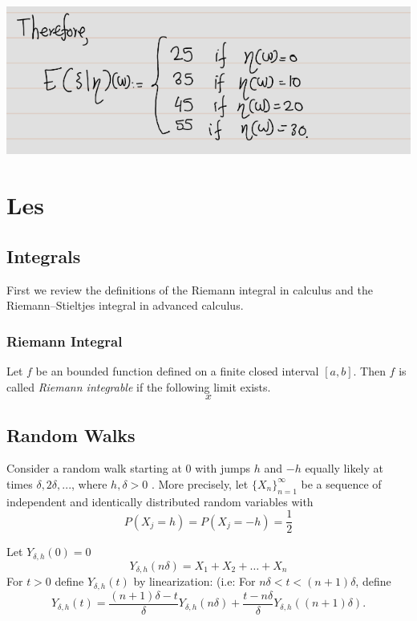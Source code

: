 \documentclass[
]{book}
\theoremstyle{definition}
\theoremstyle{definition}
\theoremstyle{definition}
\theoremstyle{definition}
\theoremstyle{remark}
\begin{document}
\includegraphics[width=18cm,height=\textheight]{fig/fig eg2.2-3.png}

\chapter{Les}\label{les}

\section{Integrals}\label{integrals}

First we review the definitions of the Riemann integral in calculus and the Riemann--Stieltjes integral in advanced calculus.

\subsection{Riemann Integral}\label{riemann-integral}

Let \(f\) be an bounded function defined on a finite closed interval \([a, b]\). Then \(f\) is called \emph{Riemann integrable} if the following limit exists.
\begin{equation}
x
\end{equation}

\section{Random Walks}\label{random-walks}

Consider a random walk starting at 0 with jumps \(h\) and \(-h\) equally likely at times \(\delta, 2\delta,...\), where \(h,\delta>0\) . More precisely, let \(\{X_n\}_{n=1}^\infty\) be a sequence of independent and identically distributed random variables with
\[P(X_j = h) = P(X_j = −h) = \frac{1}{2}\]

Let \(Y_{\delta,h}(0) =0\)
\[Y_{\delta,h}(n\delta) = X_1 + X_2 + \ldots + X_n\]
For \(t > 0\) define \(Y_{\delta,h}(t)\) by linearization:
(i.e: For \(n\delta < t < (n + 1)\delta\), define
\[Y_{\delta,h}(t) = \frac{(n + 1)\delta - t}{\delta} Y_{\delta,h}(n\delta) + \frac{t - n\delta}{\delta} Y_{\delta,h}((n + 1)\delta).\]

  
\end{document}
